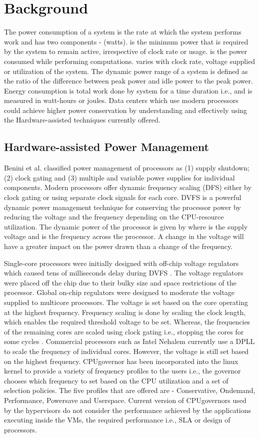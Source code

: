\documentclass{sig-alternate}
\begin{document}
\section{Background}
\label{sec:background}
The power consumption of a system is the rate at which the system performs work and has two components -  (watts).  is the minimum power that is required by the system to remain active, irrespective of clock rate or usage.  is the power consumed while performing computations.  varies with clock rate, voltage supplied or utilization of the system. The dynamic power range of a system is defined as the ratio of the difference between peak power and idle power to the peak power. Energy consumption is total work done by system for a time duration i.e.,  and is measured in watt-hours or joules. Data centers which use modern processors could achieve higher power conservation by understanding and effectively using the Hardware-assisted techniques currently offered. 
\subsection{Hardware-assisted Power Management}
Benini et al. \cite{Benini2000} classified power management of processors as (1) supply shutdown; (2) clock gating and (3) multiple and variable power supplies for individual components. Modern processors offer dynamic frequency scaling (DFS) either by clock gating or using separate clock signals for each core. DVFS is a powerful dynamic power management technique for conserving the processor power by reducing the voltage and the frequency depending on the CPU-resource utilization. The dynamic power of the processor is given by  where  is the supply voltage and  is the frequency across the processor. A change in the voltage will have a greater impact on the power drawn than a change of the frequency. 

Single-core processors were initially designed with off-chip voltage regulators which caused tens of milliseconds delay during DVFS \cite{Zhao2011}. The voltage regulators were placed off the chip due to their bulky size and space restrictions of the processor. Global on-chip regulators were designed to moderate the voltage supplied to multicore processors. The voltage is set based on the core operating at the highest frequency. Frequency scaling is done by scaling the clock length, which enables the required threshold voltage to be set. Whereas, the frequencies of the remaining cores are scaled using clock gating i.e., stopping the cores for some cycles \cite{Yadav}. Commercial processors such as Intel Nehalem currently use a DPLL to scale the frequency of individual cores. However, the voltage is still set based on the highest frequency. 
CPUgovernor has been incorporated into the linux kernel to provide a variety of frequency profiles to the users i.e., the governor chooses which frequency to set based on the CPU utilization and a set of selection policies. The five profiles that are offered are - Conservative, Ondemand, Performance, Powersave and Userspace. Current version of CPUgovernors used by the hypervisors do not consider the performance achieved by the applications executing inside the VMs, the required performance i.e., SLA or design of processors. 
\end{document}
